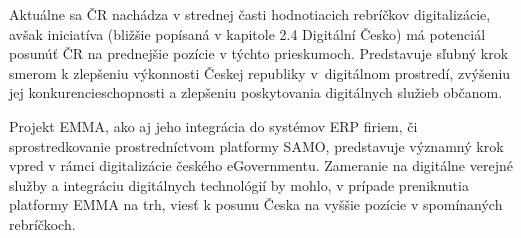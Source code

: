 Aktuálne sa ČR nachádza v strednej časti hodnotiacich rebríčkov digitalizácie, avšak iniciatíva  (bližšie popísaná v kapitole 2.4 Digitální Česko) má potenciál posunúť ČR na prednejšie pozície v týchto prieskumoch. Predstavuje sľubný krok smerom k zlepšeniu výkonnosti Českej republiky v~digitálnom prostredí, zvýšeniu jej konkurencieschopnosti a zlepšeniu poskytovania digitálnych služieb občanom.

Projekt EMMA, ako aj jeho integrácia do systémov ERP firiem, či sprostredkovanie prostredníctvom platformy SAMO, predstavuje významný krok vpred v rámci digitalizácie českého eGovernmentu. Zameranie na digitálne verejné služby a integráciu digitálnych technológií by mohlo, v prípade preniknutia platformy EMMA na trh, viesť k posunu Česka na vyššie pozície v spomínaných rebríčkoch.


%
%
%

